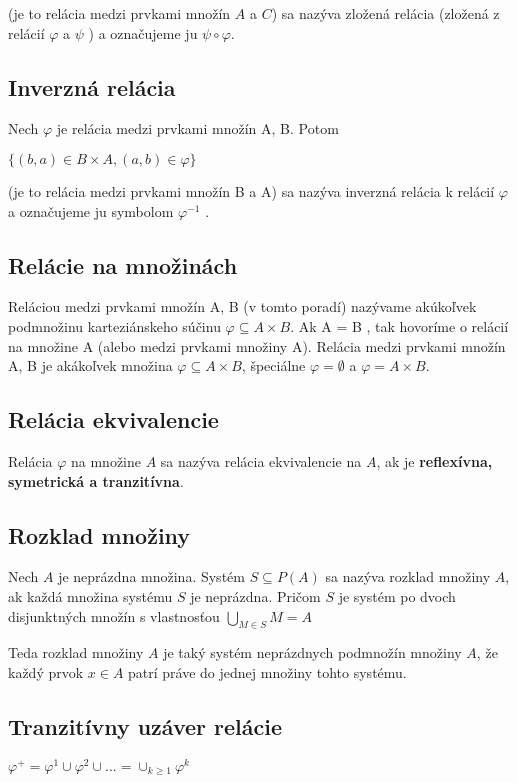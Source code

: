 		(je to relácia medzi prvkami množín $A$ a $C$) sa nazýva zložená relácia (zložená z relácií $\varphi$ a $\psi$ ) a označujeme ju $\psi \circ  \varphi$.

 	\subsection{Inverzná relácia}

		Nech $\varphi$ je relácia medzi prvkami množín A, B. Potom

		$\{( b, a ) \in B \times A, ( a, b ) \in \varphi \} $

		(je to relácia medzi prvkami množín B a A) sa nazýva inverzná relácia k relácií $\varphi$ a označujeme ju symbolom $\varphi^{-1}$ .

	\subsection{Relácie na množinách} 
		Reláciou medzi prvkami množín A, B (v tomto poradí) nazývame akúkoľvek podmnožinu karteziánskeho súčinu $\varphi \subseteq A \times B$. Ak A = B , tak hovoríme o relácií na množine A (alebo medzi prvkami množiny A). Relácia medzi prvkami množín A, B je akákoľvek množina $\varphi \subseteq A \times B $, špeciálne $\varphi = \emptyset$ a $\varphi = A \times B$.
	\subsection{Relácia ekvivalencie}
		Relácia $\varphi$ na množine $A$ sa nazýva relácia ekvivalencie na $A$, ak je \textbf{reflexívna, symetrická a tranzitívna}.

	\subsection{Rozklad množiny}

		Nech $A$ je neprázdna množina. Systém $S \subseteq P (A)$ sa nazýva rozklad množiny $A$, ak každá množina systému $S$ je neprázdna. Pričom $S$ je systém po dvoch disjunktných množín s vlastnosťou $\bigcup_{M \in S} M = A$

		Teda rozklad množiny $A$ je taký systém neprázdnych podmnožín množiny $A$, že každý prvok
		$x \in A$ patrí práve do jednej množiny tohto systému.

	\subsection{Tranzitívny uzáver relácie}
		$\varphi^{+} = \varphi^{1} \cup \varphi^{2} \cup ... = \cup_{k \geq 1} \varphi^k$

